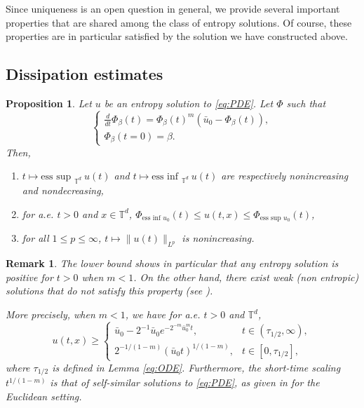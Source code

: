 \documentclass[11pt]{article}
\newtheorem{prop}[thm]{Proposition}
\newtheorem{remark}[thm]{Remark}
\numberwithin{equation}{section} %
\newcommand{\T}{{\mathbb{T}}}
\newcommand{\be}{\beta}
\begin{document}
Since uniqueness is an open question in general, we provide several important properties that are shared among the class of entropy solutions. Of course, these properties are in particular satisfied by the solution we have constructed above. 

\subsection{Dissipation estimates}

\begin{prop}
    Let $u$ be an entropy solution to \eqref{eq:PDE}. Let  $\Phi$ such that  
    \begin{equation*}
    \begin{cases}
         \displaystyle \frac{d}{dt} \Phi_\be(t) = \Phi_\be(t)^m(\bar u_0 - \Phi_\be(t)), \\
         \Phi_\be(t=0) = \beta.
    \end{cases}
    \end{equation*} 
    Then, 
    \begin{enumerate}[label=\roman*.]
        \item $t\mapsto \text{ess sup }_{\T^d }\  u(t)$ and $t\mapsto \text{ess inf }_{\T^d }\  u(t)$ are respectively nonincreasing and nondecreasing,
        \item for a.e. $t>0$ and $x\in \T^d$, $\Phi_{\text{ess inf } u_0 }(t) \le u(t,x) \le \Phi_{\text{ess sup } u_0}(t)$,
        \item for all $1\le p\le \infty$, $t\mapsto \|u(t)\|_{L^p}$ is nonincreasing.
    \end{enumerate}
\end{prop}
\begin{remark}
    The lower bound shows in particular that any entropy solution is positive for $t>0$ when $m<1$. On the other hand, there exist weak (non entropic) solutions that do not satisfy this property (see \cite{CGV22FastRegularisation}).

    More precisely, when $m<1$, we have for a.e. $t>0$ and $\T^d$, 
    \begin{equation}\label{eq:lowerbarrier}
         u(t,x) \ge \begin{cases}
            \displaystyle \bar u_0 - 2^{-1}\bar u_0 e^{-2^{-m}\bar  u_0^m t}, & t\in (\tau_{1/2},\infty),\\
            \displaystyle 2^{-1/(1-m)}(\bar u_0 t)^{1/(1-m)} ,& t\in [0,\tau_{1/2}],
        \end{cases}
    \end{equation}
    where $\tau_{1/2}$ is defined in Lemma \ref{eq:ODE}. Furthermore, the short-time scaling $t^{1/(1-m)}$ is that of self-similar solutions to \eqref{eq:PDE}, as given in \cite{CGV22FastRegularisation} for the Euclidean setting.
\end{remark}
\end{document}
